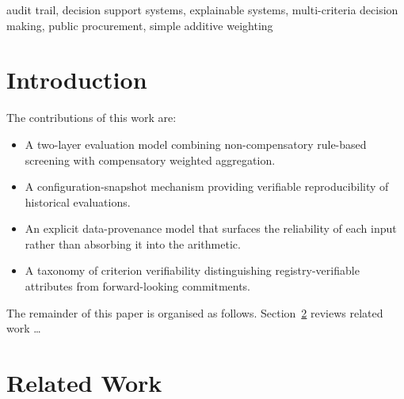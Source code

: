\documentclass[conference]{IEEEtran}
\begin{document}
\maketitle

\begin{abstract}
Public procurement evaluation is frequently opaque \dots
\end{abstract}

\begin{IEEEkeywords}
audit trail, decision support systems, explainable systems,
multi-criteria decision making, public procurement, simple additive
weighting
\end{IEEEkeywords}

\section{Introduction}
\label{sec:intro}


The contributions of this work are:

\begin{itemize}
\item A two-layer evaluation model combining non-compensatory rule-based
      screening with compensatory weighted aggregation.
\item A configuration-snapshot mechanism providing verifiable
      reproducibility of historical evaluations.
\item An explicit data-provenance model that surfaces the reliability of
      each input rather than absorbing it into the arithmetic.
\item A taxonomy of criterion verifiability distinguishing
      registry-verifiable attributes from forward-looking commitments.
\end{itemize}

The remainder of this paper is organised as follows.
Section~\ref{sec:related} reviews related work \dots

\section{Related Work}
\label{sec:related}
\end{document}
